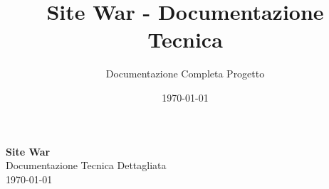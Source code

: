 \documentclass[a4paper,12pt]{report}
\title{Site War - Documentazione Tecnica}
\author{Documentazione Completa Progetto}
\date{\today}
\begin{document}
\begin{titlepage}
    \centering
    \vspace*{1cm}
    {\huge\bfseries Site War\\}
    \vspace{1.5cm}
    {\Large Documentazione Tecnica Dettagliata\\}
    \vspace{2cm}
    \vspace{2cm}
    {\large \today\\}
\end{titlepage}

\tableofcontents
\clearpage











\end{document}
